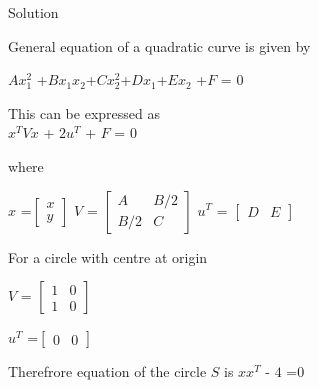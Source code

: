\documentclass{beamer}
\begin{document}
\begin{frame}
[t]{Solution}

General equation of a quadratic curve is given by 
 \vspace{0.5cm}
\hspace{1.5cm} 

$A$$x^2_1$ +$B$$x_1x_2$+$C$$x^2_2$+$D$$x_1$+$E$$x_2$ +$F$ = $0$
\vspace{0.5cm}

This can be expressed as \\
 \vspace{0.5cm}
 \hspace{1cm}
  $x^T$$V$$x$ + $2u^T$ + $F$ = $0$ 
 
 
where 
\vspace{0.5cm}

$x$ =$
\begin{bmatrix}
x\\
y
\end{bmatrix}
$
\hspace{1cm}
$V$ = $\begin{bmatrix}

A & B/2\\
B/2 & C
\end{bmatrix}$ 
\vspace{1cm}
\hspace{1cm}
$u^T$ =
$\begin{bmatrix}
D & E
\end{bmatrix}$ 
 
 
 
\end{frame}



\begin{frame}

For a circle with centre at origin
\vspace{1cm}


$V$ =
$
\begin{bmatrix}
1 & 0\\
1 & 0
\end{bmatrix}$ 
\vspace{1cm}

$u^T$ =$\begin{bmatrix}
0 & 0
\end{bmatrix}$

\vspace{1cm}

Therefrore equation of the circle $S$ is $xx^T$ - $4$ =$0$

\end{frame}
\end{document}
